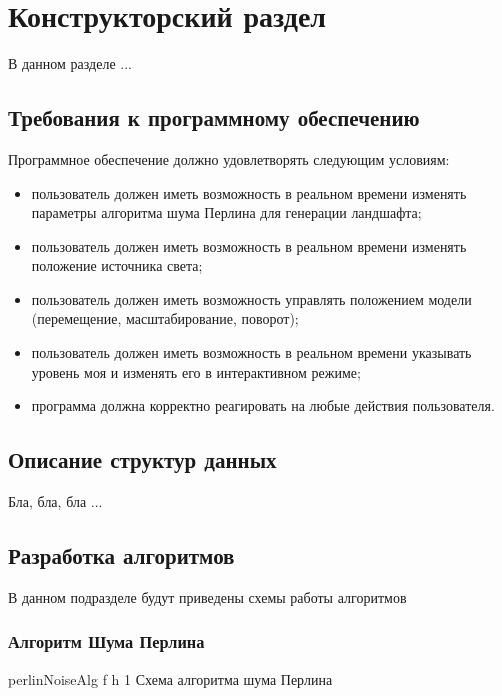 \chapter{Конструкторский раздел}

В данном разделе ...

\section{Требования к программному обеспечению}

Программное обеспечение должно удовлетворять следующим условиям:

\begin{itemize}[label=--]
	\item пользователь должен иметь возможность в реальном времени изменять параметры алгоритма шума Перлина для генерации ландшафта;
	\item пользователь должен иметь возможность в реальном времени изменять положение источника света;
	\item пользователь должен иметь возможность управлять положением модели (перемещение, масштабирование, поворот);
	\item пользователь должен иметь возможность в реальном времени указывать уровень моя и изменять его в интерактивном режиме;
	\item программа должна корректно реагировать на любые действия пользователя.
\end{itemize}

\section{Описание структур данных}

Бла, бла, бла ...

\section{Разработка алгоритмов}

В данном подразделе будут приведены схемы работы алгоритмов

\subsection{Алгоритм Шума Перлина}

{perlinNoiseAlg} %
{f} %
{h} %
{1\textwidth} %
{Схема алгоритма шума Перлина} %



